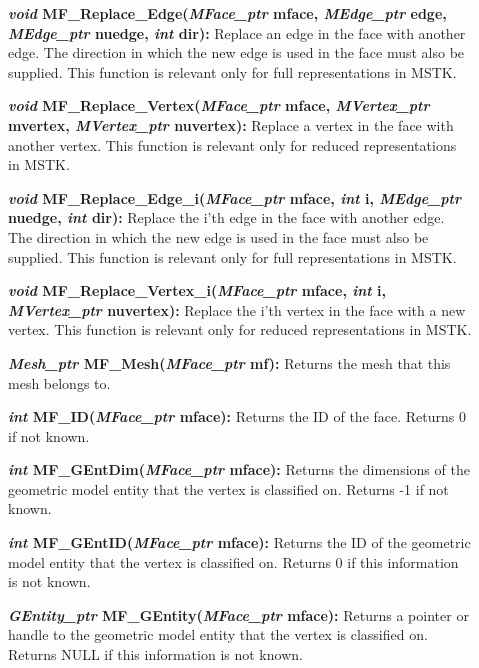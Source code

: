 \documentclass[12pt]{article}
\begin{document}
\begin{description}
\item[]\textbf{\textit{void} MF\_Replace\_Edge(\textit{MFace\_ptr} mface,
\textit{MEdge\_ptr} edge, \textit{MEdge\_ptr} nuedge, \textit{int}
dir):} Replace an edge in the face with another edge. The direction
in which the new edge is used in the face must also be supplied. This
function is relevant only for full representations in MSTK.

\item[]\textbf{\textit{void} MF\_Replace\_Vertex(\textit{MFace\_ptr} mface,
\textit{MVertex\_ptr} mvertex, \textit{MVertex\_ptr} nuvertex):}
Replace a vertex in the face with another vertex. This function is
relevant only for reduced representations in MSTK.

\item[]\textbf{\textit{void} MF\_Replace\_Edge\_i(\textit{MFace\_ptr} mface,
\textit{int} i, \textit{MEdge\_ptr} nuedge, \textit{int} dir):} Replace
the i'th edge in the face with another edge. The direction in which the
new edge is used in the face must also be supplied. This function is
relevant only for full representations in MSTK.

\item[]\textbf{\textit{void} MF\_Replace\_Vertex\_i(\textit{MFace\_ptr}
mface, \textit{int} i, \textit{MVertex\_ptr} nuvertex):} Replace the
i'th vertex in the face with a new vertex. This function is relevant
only for reduced representations in MSTK.

\item[]\textbf{\textit{Mesh\_ptr} MF\_Mesh(\textit{MFace\_ptr} mf):} Returns the mesh that this mesh belongs to.

\item[]\textbf{\textit{int} MF\_ID(\textit{MFace\_ptr} mface):} Returns the ID of the face. Returns 0 if not known.

\item[]\textbf{\textit{int} MF\_GEntDim(\textit{MFace\_ptr} mface):} Returns the dimensions of the geometric model entity that the vertex is classified on. Returns -1 if not known.

\item[]\textbf{\textit{int} MF\_GEntID(\textit{MFace\_ptr} mface):} Returns the ID of the geometric model entity that the vertex is classified on. Returns 0 if this information is not known.

\item[]\textbf{\textit{GEntity\_ptr} MF\_GEntity(\textit{MFace\_ptr} mface):} Returns a pointer or handle to the geometric model entity that the vertex is classified on. Returns NULL if this information is not known.


\end{description}
\end{document}
